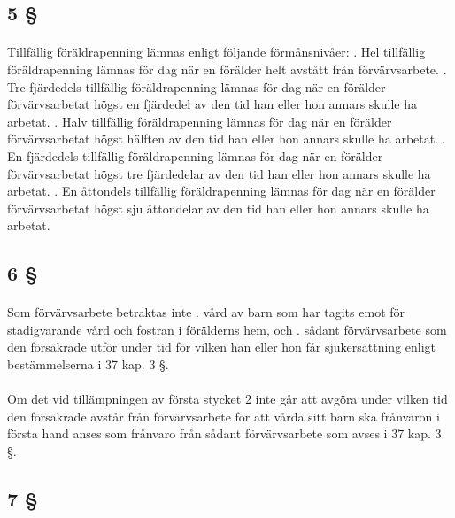 \documentclass[a4paper,notitlepage,openany,10pt]{book}
\begin{document}
\subsection*{5 §}
\paragraph*{}
Tillfällig föräldrapenning lämnas enligt följande förmånsnivåer:
. Hel tillfällig föräldrapenning lämnas för dag när en förälder helt avstått från förvärvsarbete.
. Tre fjärdedels tillfällig föräldrapenning lämnas för dag när en förälder förvärvsarbetat högst en fjärdedel av den tid han eller hon annars skulle ha arbetat.
. Halv tillfällig föräldrapenning lämnas för dag när en förälder förvärvsarbetat högst hälften av den tid han eller hon annars skulle ha arbetat.
. En fjärdedels tillfällig föräldrapenning lämnas för dag när en förälder förvärvsarbetat högst tre fjärdedelar av den tid han eller hon annars skulle ha arbetat.
. En åttondels tillfällig föräldrapenning lämnas för dag när en förälder förvärvsarbetat högst sju åttondelar av den tid han eller hon annars skulle ha arbetat.
\subsection*{6 §}
\paragraph*{}
Som förvärvsarbete betraktas inte
. vård av barn som har tagits emot för stadigvarande vård och fostran i förälderns hem, och
. sådant förvärvsarbete som den försäkrade utför under tid för vilken han eller hon får sjukersättning enligt bestämmelserna i 37 kap. 3 §.
\paragraph*{}
Om det vid tillämpningen av första stycket 2 inte går att avgöra under vilken tid den försäkrade avstår från förvärvsarbete för att vårda sitt barn ska frånvaron i första hand anses som frånvaro från sådant förvärvsarbete som avses i 37 kap. 3 §.
\subsection*{7 §}
\end{document}
